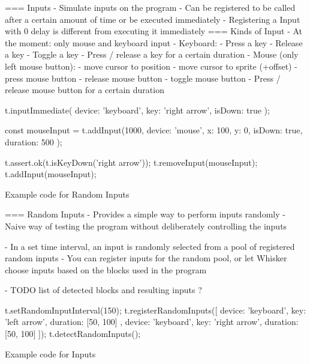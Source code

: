 === Inputs
- Simulate inputs on the program
- Can be registered to be called after a certain amount of time or be executed immediately
- Registering a Input with 0 delay is different from executing it immediately
=== Kinds of Input
- At the moment: only mouse and keyboard input
- Keyboard:
    - Press a key
    - Release a key
    - Toggle a key
    - Press / release a key for a certain duration
- Mouse (only left mouse button):
    - move cursor to position
    - move cursor to sprite (+offset)
    - press mouse button
    - release mouse button
    - toggle mouse button
    - Press / release mouse button for a certain duration

\begin{listing}[ht]
    \centering
    \begin{javascriptcode}
        t.inputImmediate({
            device: 'keyboard',
            key: 'right arrow',
            isDown: true
        });

        const mouseInput = t.addInput(1000, {
            device: 'mouse',
            x: 100,
            y: 0,
            isDown: true,
            duration: 500
        });

        t.assert.ok(t.isKeyDown('right arrow'));
        t.removeInput(mouseInput);
        t.addInput(mouseInput);
    \end{javascriptcode}
    \vspace{-\bigskipamount}
    \caption{Example code for Random Inputs}
    \label{fig:example_code_for_random_inputs}
\end{listing}

=== Random Inputs
- Provides a simple way to perform inputs randomly
- Naive way of testing the program without deliberately controlling the inputs

- In a set time interval, an input is randomly selected from a pool of registered random inputs
- You  can register inputs for the random pool, or let Whisker choose inputs based on the blocks used in the program

- TODO list of detected blocks and resulting inputs ?

\begin{listing}[ht]
    \centering
    \begin{javascriptcode}
        t.setRandomInputInterval(150);
        t.registerRandomInputs([
            {
                device: 'keyboard',
                key: 'left arrow',
                duration: [50, 100]
            },
            {
                device: 'keyboard',
                key: 'right arrow',
                duration: [50, 100]
            }
        ]);
        t.detectRandomInputs();
    \end{javascriptcode}
    \vspace{-\bigskipamount}
    \caption{Example code for Inputs}
    \label{fig:example_code_for_inputs}
\end{listing}

